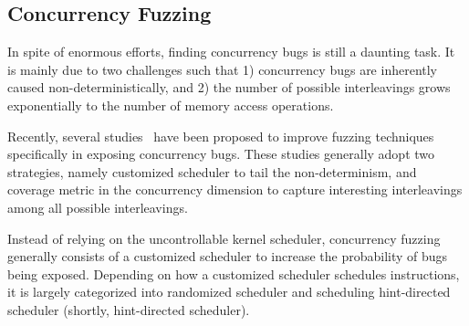 \subsection{Concurrency Fuzzing}
\label{ss:concurrencyfuzzing}




In spite of enormous efforts, finding concurrency bugs is still a
daunting task.
%
It is mainly due to two challenges such that 1) concurrency bugs are
inherently caused non-deterministically, and 2) the number of possible
interleavings grows exponentially to the number of memory access
operations.

Recently, several studies~\cite{razzer, krace, snowboard, muzz} have
been proposed to improve fuzzing techniques specifically in exposing
concurrency bugs.
%
These studies generally adopt two strategies, namely customized
scheduler to tail the non-determinism, and coverage metric in the
concurrency dimension to capture interesting interleavings among all
possible interleavings.




%
Instead of relying on the uncontrollable kernel scheduler, concurrency
fuzzing generally consists of a customized scheduler to increase the
probability of bugs being exposed.
%
Depending on how a customized scheduler schedules instructions, it is
largely categorized into randomized scheduler and scheduling
hint-directed scheduler (shortly, hint-directed scheduler).


